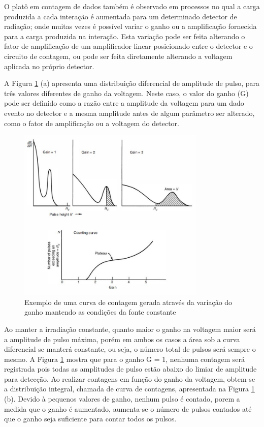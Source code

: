 \documentclass[11pt,a4paper]{article}
\begin{document}
		O platô em contagem de dados também é observado em processos no qual a carga produzida a cada interação é aumentada para um determinado detector de radiação; onde muitas vezes é possível variar o ganho ou a amplificação fornecida para a carga produzida na interação. Esta variação pode ser feita alterando o fator de amplificação de um amplificador linear posicionado entre o detector e o circuito de contagem, ou pode ser feita diretamente alterando a voltagem aplicada no próprio detector. 

		A Figura \ref{fig:curvaContagemGanho} (a) apresenta uma distribuição diferencial de amplitude de pulso, para três valores diferentes de ganho da voltagem. Neste caso, o valor do ganho (G) pode ser definido como a razão entre a amplitude da voltagem para um dado evento no detector e a mesma amplitude antes de algum parâmetro ser alterado, como o fator de amplificação ou a voltagem do detector. 

			\begin{figure}[h]
				\centering
				\includegraphics[width=0.8\textwidth]{Imagens/curvaContagemGanho.jpg}
				\caption{Exemplo de uma curva de contagem gerada através da variação do ganho mantendo as condições da fonte constante}
				\label{fig:curvaContagemGanho}
			\end{figure}

		
		Ao manter a irradiação constante, quanto maior o ganho na voltagem maior será a amplitude de pulso máxima, porém em ambos os casos a área sob a curva diferencial se manterá constante, ou seja, o número total de pulsos  será sempre o mesmo. A Figura \ref{fig:curvaContagemGanho} mostra que para o ganho G = 1, nenhuma contagem será registrada pois todas as amplitudes de pulso estão abaixo do limiar de amplitude para detecção. Ao realizar contagens em função do ganho da voltagem, obtem-se a distribuição integral, chamada de curva de contagens, apresentada na Figura \ref{fig:curvaContagemGanho} (b). Devido à pequenos valores de ganho, nenhum pulso é contado, porem a medida que o ganho é aumentado, aumenta-se o número de pulsos contados até que o ganho seja suficiente para contar todos os pulsos. 
\end{document}
